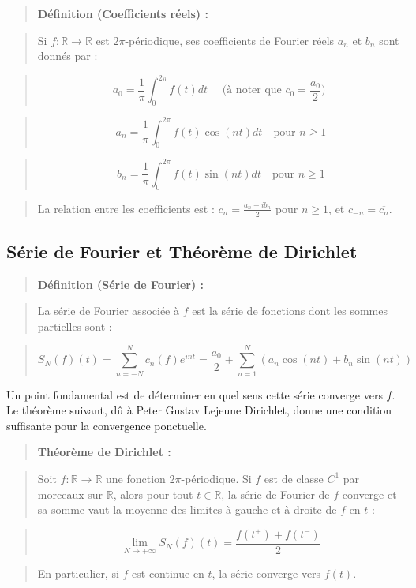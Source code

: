 \documentclass[12pt,a4paper]{article}
\begin{document}
\begin{quote}
\textbf{Définition (Coefficients réels) :}
\end{quote}
\begin{quote}
Si $f : \mathbb{R} \to \mathbb{R}$ est $2\pi$-périodique, ses coefficients de Fourier réels $a_n$ et $b_n$ sont donnés par :
\end{quote}
\begin{quote}
$$a_0 = \frac{1}{\pi} \int_0^{2\pi} f(t) dt \quad \text{ (à noter que } c_0 = \frac{a_0}{2} \text{) }$$
\end{quote}
\begin{quote}
$$a_n = \frac{1}{\pi} \int_0^{2\pi} f(t) \cos(nt) dt \quad \text{pour } n \ge 1$$
\end{quote}
\begin{quote}
$$b_n = \frac{1}{\pi} \int_0^{2\pi} f(t) \sin(nt) dt \quad \text{pour } n \ge 1$$
\end{quote}
\begin{quote}
La relation entre les coefficients est : $c_n = \frac{a_n - i b_n}{2}$ pour $n \ge 1$, et $c_{-n} = \overline{c_n}$.
\end{quote}

\subsection{Série de Fourier et Théorème de Dirichlet}

\begin{quote}
\textbf{Définition (Série de Fourier) :}
\end{quote}
\begin{quote}
La série de Fourier associée à $f$ est la série de fonctions dont les sommes partielles sont :
\end{quote}
\begin{quote}
$$S_N(f)(t) = \sum_{n=-N}^N c_n(f) e^{int} = \frac{a_0}{2} + \sum_{n=1}^N \left( a_n \cos(nt) + b_n \sin(nt) \right)$$
\end{quote}

Un point fondamental est de déterminer en quel sens cette série converge vers $f$. Le théorème suivant, dû à Peter Gustav Lejeune Dirichlet, donne une condition suffisante pour la convergence ponctuelle.

\begin{quote}
\textbf{Théorème de Dirichlet :}
\end{quote}
\begin{quote}
Soit $f : \mathbb{R} \to \mathbb{R}$ une fonction $2\pi$-périodique. Si $f$ est de classe $C^1$ par morceaux sur $\mathbb{R}$, alors pour tout $t \in \mathbb{R}$, la série de Fourier de $f$ converge et sa somme vaut la moyenne des limites à gauche et à droite de $f$ en $t$ :
\end{quote}
\begin{quote}
$$\lim_{N \to +\infty} S_N(f)(t) = \frac{f(t^+) + f(t^-)}{2}$$
\end{quote}
\begin{quote}
En particulier, si $f$ est continue en $t$, la série converge vers $f(t)$.
\end{quote}
\end{document}
